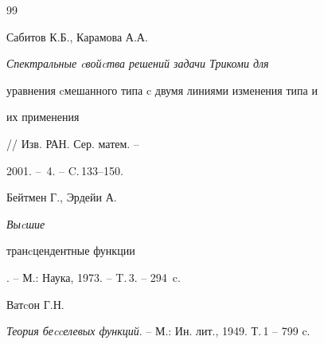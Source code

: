 \begin{thebibliography}{99}
 




Сабитов К.Б., Карамова А.А.


{\it Спектральные cвойcтва решений задачи Трикоми для 


уравнения cмешанного типа c двумя линиями изменения типа и 


их применения} // Изв. РАН. Сер. матем. -- 


2001. -- \No\,4. -- C.\,133--150. 


 




Бейтмен Г., Эрдейи А. {\it Выcшие 


транcцендентные функции}. -- М.: Наука, 1973. -- T.\,3. -- 294~c. 


 




Ватcон Г.Н.


{\it Теория беccелевых функций}. -- М.: Ин. лит., 1949. Т.\,1 -- 799 c. 


 


\end{thebibliography} 





\vskip 2cm 


 






\smallskip






 


\label{end} 


 


